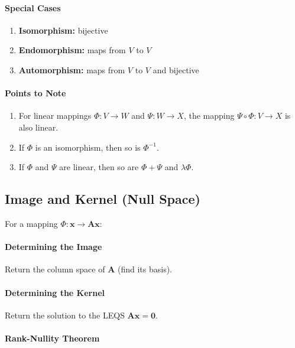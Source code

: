\documentclass[10pt,twoside,twocolumn]{article}
\begin{document}
\paragraph{Special Cases}
\begin{enumerate}
\item \textbf{Isomorphism:} bijective 
\item \textbf{Endomorphism:} maps from $V$ to $V$ 
\item \textbf{Automorphism:} maps from $V$ to $V$ and bijective 
\end{enumerate}

\paragraph{Points to Note}
\begin{enumerate}
\item For linear mappings $\Phi:V\rightarrow W$ and $\Psi:W\rightarrow X$,
the mapping $\Psi\circ\Phi:V\rightarrow X$ is also linear. 
\item If $\Phi$ is an isomorphism, then so is $\Phi^{-1}$. 
\item If $\Phi$ and $\Psi$ are linear, then so are $\Phi+\Psi$ and $\lambda\Phi$. 
\end{enumerate}

\subsection{Image and Kernel (Null Space)}

For a mapping $\Phi:\mathbf{x}\rightarrow\mathbf{A}\mathbf{x}$:


\paragraph{Determining the Image}

Return the column space of $\mathbf{A}$ (find its basis).


\paragraph{Determining the Kernel}

Return the solution to the LEQS $\mathbf{A}\mathbf{x}=\mathbf{0}$.


\paragraph{Rank-Nullity Theorem}
\end{document}
